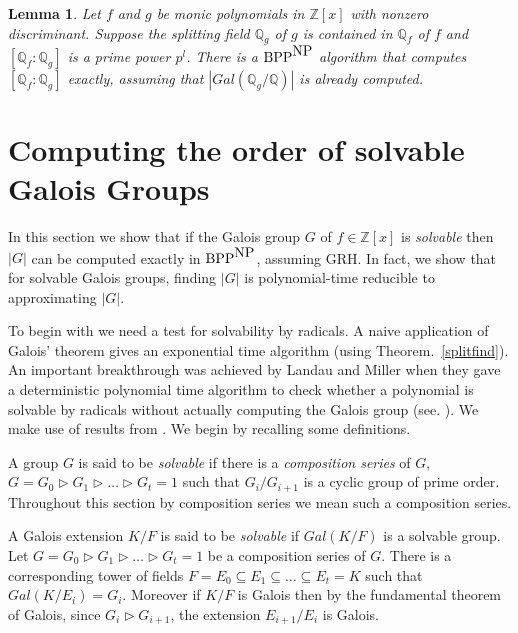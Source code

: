 \documentclass{article}
\newtheorem{lemma}[theorem]{Lemma}
\newcommand{\Gal}[1]{\ensuremath{Gal\left(#1\right)}}
\newcommand{\Q}[0]{\ensuremath{\mathbb{Q}}}
\newcommand{\Z}[0]{\ensuremath{\mathbb{Z}}}
\newcommand{\BPP}{\mbox{\rm BPP}}
\newcommand{\NP}{\mbox{\rm NP}}
\begin{document}
\begin{lemma}\label{star}
  Let $f$ and $g$ be monic polynomials in $\Z[x]$ with nonzero
  discriminant. Suppose the splitting field $\Q_g$ of $g$ is contained
  in $\Q_f$ of $f$ and $[\Q_f:\Q_g]$ is a prime power $p^l$. There is
  a $\BPP^{\NP}$ algorithm that computes $[\Q_f:\Q_g]$ exactly,
  assuming that $|\Gal{\Q_g/\Q}|$ is already computed.
\end{lemma}
%

\section{Computing the order of solvable Galois Groups}\label{sol:order}

In this section we show that if the Galois group $G$ of $f\in\Z[x]$ is
\emph{solvable} then $|G|$ can be computed exactly in $\BPP^{\NP}$,
assuming GRH. In fact, we show that for solvable Galois groups,
finding $|G|$ is polynomial-time reducible to approximating $|G|$.

To begin with we need a test for solvability by radicals.  A naive
application of Galois' theorem gives an exponential time algorithm
(using Theorem.~\ref{splitfind}). An important breakthrough was
achieved by Landau and Miller when they gave a deterministic
polynomial time algorithm to check whether a polynomial is solvable by
radicals without actually computing the Galois group (see.
\cite{landau85solvability}). We make use of results from
\cite{landau85solvability}. We begin by recalling some definitions.

A group $G$ is said to be \emph{solvable} if there is a
\emph{composition series} of $G$, $G = G_0 \rhd G_1 \rhd \ldots \rhd
G_t = {1}$ such that $G_i/G_{i+1}$ is a cyclic group of prime order.
Throughout this section by composition series we mean such a
composition series.
  
A Galois extension $K/F$ is said to be \emph{solvable} if $\Gal{K/F}$
is a solvable group. Let $G = G_0 \rhd G_1 \rhd \ldots \rhd G_t = {1}$
be a composition series of $G$. There is a corresponding tower of
fields $F = E_0 \subseteq E_1 \subseteq \ldots \subseteq E_t = K$ such
that $\Gal{K/E_i} = G_i$. Moreover if $K/F$ is Galois then by the
fundamental theorem of Galois, since $G_i \rhd G_{i+1}$, the extension
$E_{i+1}/E_i$ is Galois.
  
\end{document}
